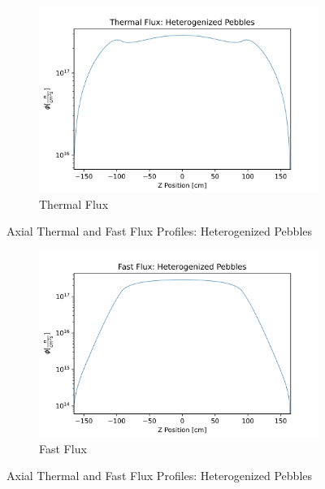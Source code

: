 \begin{figure}[H]
\centering

\begin{subfigure}{0.9\textwidth}
  \includegraphics[width=0.95\linewidth]{figures/therm_flux_het_z.png}
  \caption{Thermal Flux}
  \label{fig:het-det-z-therm}
\end{subfigure}%

\caption{Axial Thermal and Fast Flux Profiles: Heterogenized Pebbles}
\end{figure}

\begin{figure}[H]\ContinuedFloat
\centering

\begin{subfigure}{0.9\textwidth}
  \includegraphics[width=0.95\linewidth]{figures/fast_flux_het_z.png}
  \caption{Fast Flux}
  \label{fig:het-det-z-fast}
\end{subfigure}

%
\caption{Axial Thermal and Fast Flux Profiles: Heterogenized Pebbles}
\label{fig:het-det-z}
\end{figure}